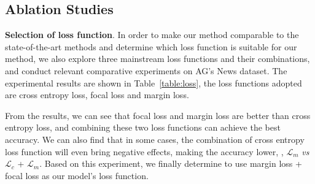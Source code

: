 \documentclass[times,twocolumn,final]{elsarticle}
\begin{document}
\begin{table}
  \centering
  \caption{Ablation studies for the three loss functions: cross entropy loss ($\mathcal{L}_{c}$), focal loss ($\mathcal{L}_{f}$) and margin loss ($\mathcal{L}_{m}$) on AG's News dataset. The best test accuracy (\%) are bold.}
  \label{table:loss}
\end{table}

\subsection{Ablation Studies}
\label{sec:ablation}

\textbf{Selection of loss function}. In order to make our method comparable to the state-of-the-art methods and determine which loss function is suitable for our method, we also explore three mainstream loss functions and their combinations, and conduct relevant comparative experiments on AG's News dataset. The experimental results are shown in Table~\ref{table:loss}, the loss functions adopted are cross entropy loss, focal loss and margin loss.

From the results, we can see that focal loss and margin loss are better than cross entropy loss, and combining these two loss functions can achieve the best accuracy. We can also find that in some cases, the combination of cross entropy loss function will even bring negative effects, making the accuracy lower, \eg, $\mathcal{L}_{m}$ \textit{vs} $\mathcal{L}_{c}$ + $\mathcal{L}_{m}$. Based on this experiment, we finally determine to use margin loss + focal loss as our model's loss function.

\begin{table}
  \centering
  \caption{Ablation studies for routing algorithms on eight text classification datasets. The best test accuracy (\%) are bold.}
  \label{table:routing}
\end{table}
\end{document}
